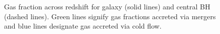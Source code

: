 \documentclass[manuscript]{aastex}
\begin{document}
\begin{figure}
\centerline{}
\caption[]{Gas fraction across redshift for galaxy (solid lines) and central BH (dashed lines). Green lines signify gas fractions accreted via mergers and blue lines designate gas accreted via cold flow.}
\label{h258numfrac} 
\end{figure}
\end{document}
